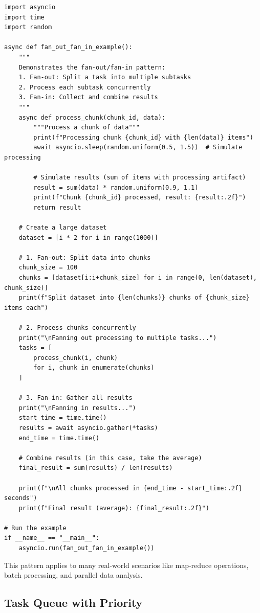 \documentclass[12pt,letterpaper]{article}
\newenvironment{macterminal}{%
    \begin{mdframed}[
        linecolor=terminalFrame,
        backgroundcolor=terminalBg,
        roundcorner=5pt,
        skipabove=10pt,
        skipbelow=10pt,
        linewidth=1pt,
        innertopmargin=10pt, %
        frametitle={%
            \tikz[baseline=(current bounding box.east), outer sep=0pt]{
                \fill[red!80!black] (0,0) circle (5pt);
                \fill[yellow!80!black] (0.7,0) circle (5pt);
                \fill[green!70!black] (1.4,0) circle (5pt);
            }
        },
        frametitlealignment=\raggedright, %
        frametitleaboveskip=8pt, %
        frametitlebelowskip=0pt, %
    ]
}{%
    \end{mdframed}%
}
\begin{document}
\begin{macterminal}
\begin{lstlisting}
import asyncio
import time
import random

async def fan_out_fan_in_example():
    """
    Demonstrates the fan-out/fan-in pattern:
    1. Fan-out: Split a task into multiple subtasks
    2. Process each subtask concurrently
    3. Fan-in: Collect and combine results
    """
    async def process_chunk(chunk_id, data):
        """Process a chunk of data"""
        print(f"Processing chunk {chunk_id} with {len(data)} items")
        await asyncio.sleep(random.uniform(0.5, 1.5))  # Simulate processing
        
        # Simulate results (sum of items with processing artifact)
        result = sum(data) * random.uniform(0.9, 1.1)
        print(f"Chunk {chunk_id} processed, result: {result:.2f}")
        return result
    
    # Create a large dataset
    dataset = [i * 2 for i in range(1000)]
    
    # 1. Fan-out: Split data into chunks
    chunk_size = 100
    chunks = [dataset[i:i+chunk_size] for i in range(0, len(dataset), chunk_size)]
    print(f"Split dataset into {len(chunks)} chunks of {chunk_size} items each")
    
    # 2. Process chunks concurrently
    print("\nFanning out processing to multiple tasks...")
    tasks = [
        process_chunk(i, chunk)
        for i, chunk in enumerate(chunks)
    ]
    
    # 3. Fan-in: Gather all results
    print("\nFanning in results...")
    start_time = time.time()
    results = await asyncio.gather(*tasks)
    end_time = time.time()
    
    # Combine results (in this case, take the average)
    final_result = sum(results) / len(results)
    
    print(f"\nAll chunks processed in {end_time - start_time:.2f} seconds")
    print(f"Final result (average): {final_result:.2f}")

# Run the example
if __name__ == "__main__":
    asyncio.run(fan_out_fan_in_example())
\end{lstlisting}
\end{macterminal}

This pattern applies to many real-world scenarios like map-reduce operations, batch processing, and parallel data analysis.

\subsection{Task Queue with Priority}
\end{document}
